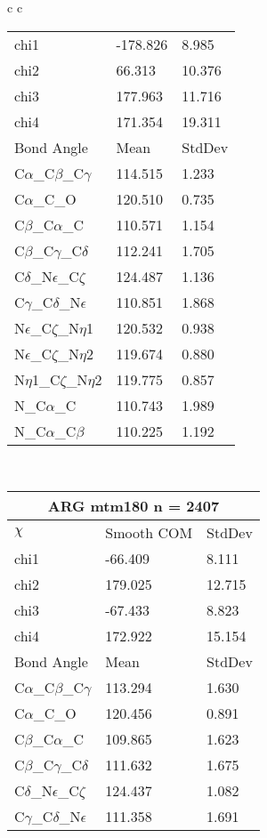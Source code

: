 \begin{longtable}{ c c }
\begin{tabular}{ l l l }
  chi1 & -178.826 & 8.985 \\ 
  chi2 & 66.313 & 10.376 \\ 
  chi3 & 177.963 & 11.716 \\ 
  chi4 & 171.354 & 19.311 \\ \midrule
  Bond Angle   & Mean     & StdDev \\ \midrule
  C$\alpha$\_C$\beta$\_C$\gamma$ & 114.515 & 1.233\\
  C$\alpha$\_C\_O & 120.510 & 0.735\\
  C$\beta$\_C$\alpha$\_C & 110.571 & 1.154\\
  C$\beta$\_C$\gamma$\_C$\delta$ & 112.241 & 1.705\\
  C$\delta$\_N$\epsilon$\_C$\zeta$ & 124.487 & 1.136\\
  C$\gamma$\_C$\delta$\_N$\epsilon$ & 110.851 & 1.868\\
  N$\epsilon$\_C$\zeta$\_N$\eta$1 & 120.532 & 0.938\\
  N$\epsilon$\_C$\zeta$\_N$\eta$2 & 119.674 & 0.880\\
  N$\eta$1\_C$\zeta$\_N$\eta$2 & 119.775 & 0.857\\
  N\_C$\alpha$\_C & 110.743 & 1.989\\
  N\_C$\alpha$\_C$\beta$ & 110.225 & 1.192\\
  \bottomrule
  \end{tabular}
  \\
  \begin{tabular}{ l l l }
  \toprule
  \multicolumn{3}{c}{ARG \textbf{mtm180} n = 2407} \\ \toprule
  $\chi$       & Smooth COM & StdDev \\ \midrule
  chi1 & -66.409 & 8.111 \\ 
  chi2 & 179.025 & 12.715 \\ 
  chi3 & -67.433 & 8.823 \\ 
  chi4 & 172.922 & 15.154 \\ \midrule
  Bond Angle   & Mean     & StdDev \\ \midrule
  C$\alpha$\_C$\beta$\_C$\gamma$ & 113.294 & 1.630\\
  C$\alpha$\_C\_O & 120.456 & 0.891\\
  C$\beta$\_C$\alpha$\_C & 109.865 & 1.623\\
  C$\beta$\_C$\gamma$\_C$\delta$ & 111.632 & 1.675\\
  C$\delta$\_N$\epsilon$\_C$\zeta$ & 124.437 & 1.082\\
  C$\gamma$\_C$\delta$\_N$\epsilon$ & 111.358 & 1.691\\

\end{tabular}
\end{longtable}
